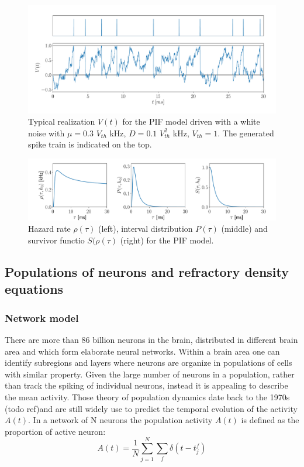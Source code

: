 \documentclass[a4paper,11pt,twoside]{article}
\numberwithin{equation}{section}
\begin{document}
\begin{figure}
	\centering
	\includegraphics[width=0.8\linewidth]{PIF_V}
	\caption{Typical realization $V(t)$ for the PIF model driven with a white noise with $\mu=0.3$ $V_{th}$ kHz, $D=0.1$ $V_{th}^2$ kHz, $V_{th}=1$. The generated spike train is indicated on the top.
	}
	\label{fig:PIF_V}
\end{figure}


\begin{figure}
	
	\includegraphics[width=\linewidth]{inversegaussian.pdf}
	\caption{Hazard rate $\rho(\tau)$ (left), interval distribution $P(\tau)$ (middle) and survivor functio $S(\rho(\tau)$ (right) for the PIF model.
	}
	\label{fig:inversegaussianprocess}
\end{figure}



\subsection{Populations of neurons and refractory density equations}

\subsubsection{Network model}

There are more than 86 billion neurons in the brain, distributed in different brain area and which form elaborate neural networks. Within a brain area one can identify subregions and layers where neurons are organize in populations of cells with similar property. Given the large number of neurons in a population, rather than track the spiking of individual neurons, instead it is appealing to describe the mean activity. 
Those theory of population dynamics date back to the 1970s (todo ref)and are still widely use to predict the temporal evolution of the activity $A(t)$. In a network of N neurons the population activity $A(t)$ is defined as the proportion of active neuron:
\begin{equation}
A(t)=\frac{1}{N}\sum_{j=1}^N\sum_f\delta(t-t_j^f)
\end{equation}
\end{document}
